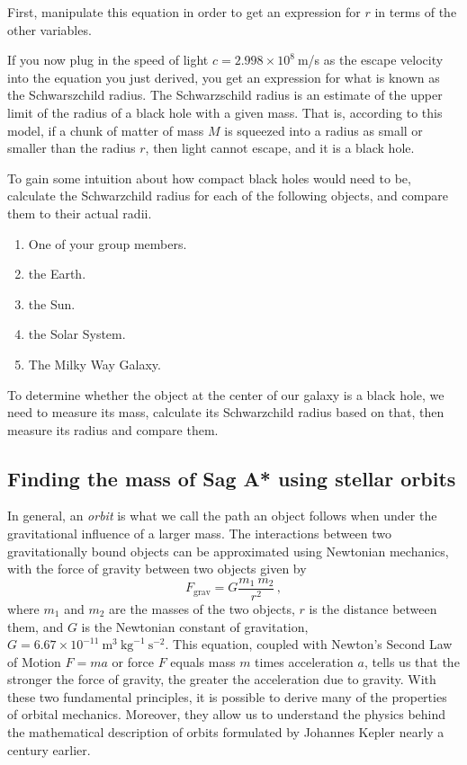 \begin{steps}
	\item  First, manipulate this equation in order to get an expression for $r$ in terms of the other variables.
\end{steps}
If you now plug in the speed of light $c = 2.998 \times 10^{8}\:$m/s as the escape velocity into the equation you just derived, you get an expression for what is known as the Schwarszchild radius. The Schwarzschild radius is an estimate of the upper limit of the radius of a black hole with a given mass. That is, according to this model, if a chunk of matter of mass $M$ is squeezed into a radius as small or smaller than the radius $r$, then light cannot escape, and it is a black hole.

\begin{steps}
	\item To gain some intuition about how compact black holes would need to be, calculate the Schwarzchild radius for each of the following objects, and compare them to their actual radii.
	\begin{enumerate}
		\item One of your group members.
		\item the Earth.
		\item the Sun.
		\item the Solar System.
		\item The Milky Way Galaxy.
	\end{enumerate}
\end{steps}

To determine whether the object at the center of our galaxy is a black hole, we need to measure its mass, calculate its Schwarzchild radius based on that, then measure its radius and compare them.

\subsection{Finding the mass of Sag A* using stellar orbits}


In general, an \textit{orbit} is what we call the path an object follows when under the gravitational influence of a larger mass. The interactions between two gravitationally bound objects can be approximated using Newtonian mechanics, with the force of gravity between two objects given by 
\begin{equation}\label{gc:eq:newton}
F_\textrm{grav} = G \frac{m_1 \: m_2}{r^2} \, ,
\end{equation}
where $m_1$ and $m_2$ are the masses of the two objects, $r$ is the distance between them, and $G$ is the Newtonian constant of gravitation, $G=6.67 \times 10^{-11}\:\textrm{m}^3 \: \textrm{kg}^{-1} \: \textrm{s}^{-2}$. This equation, coupled with Newton's Second Law of Motion $F = ma$ or force $F$ equals mass $m$ times acceleration $a$, tells us that the stronger the force of gravity, the greater the acceleration due to gravity. With these two fundamental principles, it is possible to derive many of the properties of orbital mechanics. Moreover, they allow us to understand the physics behind the mathematical description of orbits formulated by Johannes Kepler nearly a century earlier.

